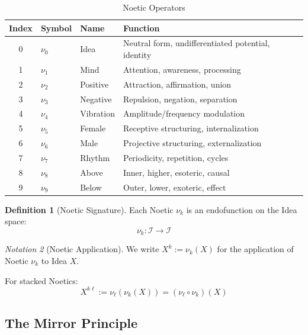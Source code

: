 \documentclass[11pt,twoside,openright]{book}
\theoremstyle{definition}
\newtheorem{definition}{Definition}[chapter]
\theoremstyle{plain}
\theoremstyle{remark}
\newtheorem{notation}[definition]{Notation}
\newcommand{\Ideas}{\mathcal{I}}
\newcommand{\noe}[1]{\nu_{#1}}
\begin{document}
\begin{table}[h]
\centering
\caption{Noetic Operators}
\label{tab:noetics}
\begin{tabular}{clll}
\toprule
\textbf{Index} & \textbf{Symbol} & \textbf{Name} & \textbf{Function} \\
\midrule
0 & $\noe{0}$ & Idea & Neutral form, undifferentiated potential, identity \\
1 & $\noe{1}$ & Mind & Attention, awareness, processing \\
2 & $\noe{2}$ & Positive & Attraction, affirmation, union \\
3 & $\noe{3}$ & Negative & Repulsion, negation, separation \\
4 & $\noe{4}$ & Vibration & Amplitude/frequency modulation \\
5 & $\noe{5}$ & Female & Receptive structuring, internalization \\
6 & $\noe{6}$ & Male & Projective structuring, externalization \\
7 & $\noe{7}$ & Rhythm & Periodicity, repetition, cycles \\
8 & $\noe{8}$ & Above & Inner, higher, esoteric, causal \\
9 & $\noe{9}$ & Below & Outer, lower, exoteric, effect \\
\bottomrule
\end{tabular}
\end{table}

\begin{definition}[Noetic Signature]
\label{def:noetic-signature}
Each Noetic $\noe{k}$ is an endofunction on the Idea space:
\[
\noe{k} : \Ideas \to \Ideas
\]
\end{definition}

\begin{notation}[Noetic Application]
\label{not:noetic-application}
We write $X^k := \noe{k}(X)$ for the application of Noetic $\noe{k}$ to Idea $X$.

For stacked Noetics:
\[
X^{k\ell} := \noe{\ell}(\noe{k}(X)) = (\noe{\ell} \circ \noe{k})(X)
\]
\end{notation}

\subsection{The Mirror Principle}
\end{document}
